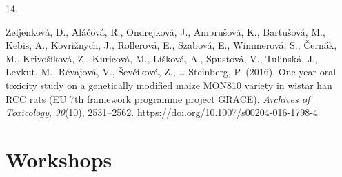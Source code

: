 \documentclass[11pt,a4paper,]{awesome-cv}
\newlength{\cslhangindent}
\newlength{\csllabelwidth}
\newenvironment{CSLReferences}[2] %
 {\begin{list}{}{%
  \setlength{\itemindent}{0pt}
  \setlength{\leftmargin}{0pt}
  \setlength{\parsep}{0pt}
  \ifodd #1
   \setlength{\leftmargin}{\cslhangindent}
   \setlength{\itemindent}{-1\cslhangindent}
  \fi
  \setlength{\itemsep}{#2\baselineskip}}}
 {\end{list}}
\newcommand{\CSLLeftMargin}[1]{\parbox[t]{\csllabelwidth}{\strut#1\strut}}
\newcommand{\CSLRightInline}[1]{\parbox[t]{\linewidth - \csllabelwidth}{\strut#1\strut}}
\begin{document}
\begin{CSLReferences}{0}{0}
\CSLLeftMargin{14. }%
\CSLRightInline{Zeljenková, D., Aláčová, R., Ondrejková, J., Ambrušová,
K., Bartušová, M., Kebis, A., Kovrižnych, J., Rollerová, E., Szabová,
E., Wimmerová, S., Černák, M., Krivošíková, Z., Kuricová, M., Líšková,
A., Spustová, V., Tulinská, J., Levkut, M., Révajová, V., Ševčíková, Z.,
\ldots{} Steinberg, P. (2016). One-year oral toxicity study on a
genetically modified maize MON810 variety in wistar han RCC rats (EU 7th
framework programme project GRACE). \emph{Archives of Toxicology},
\emph{90}(10), 2531--2562.
\url{https://doi.org/10.1007/s00204-016-1798-4}}

\end{CSLReferences}

\newpage

\section{Workshops}\label{workshops-1}
\end{document}
